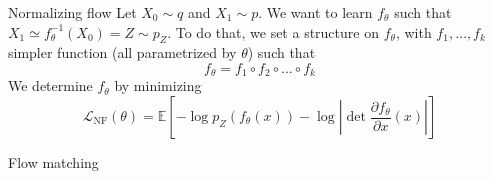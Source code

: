 \documentclass{beamer}
\begin{document}
\begin{frame}{Normalizing flow}
    Let \(X_0\sim q\) and \(X_1\sim p\). We want to learn \(f_\theta\) such that \(X_1 \simeq f_\theta^{-1}(X_0)=Z\sim p_Z\). To do that, we set a structure on \(f_\theta\), with \(f_1,\ldots,f_k\) simpler function (all parametrized by \(\theta\)) such that 
    \[f_\theta=f_1\circ f_2\circ\ldots\circ f_k\] 
    We determine \(f_\theta\) by minimizing 
    \[\mathcal{L}_\text{NF}(\theta)= \mathbb{E}\left[-\log p_Z(f_\theta(x))-\log \left|\det \frac{\partial f_\theta}{\partial x}(x)\right|\right]\]
\end{frame}

\begin{frame}{Flow matching}
    
\end{frame}
\end{document}
